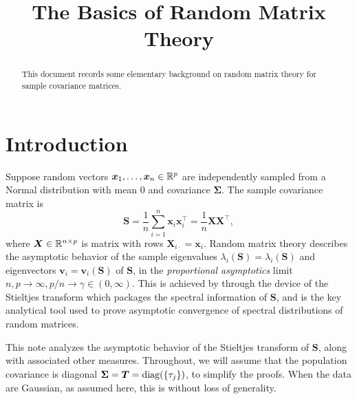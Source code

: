 \documentclass{article}
\title{ {\bf The Basics of Random Matrix Theory} }
\newcommand{\bx}{\boldsymbol{x}}
\newcommand{\bv}{\boldsymbol{v}}
\newcommand{\bX}{\boldsymbol{X}}
\newcommand{\bSigma}{\boldsymbol{\Sigma}}
\newcommand{\bS}{\boldsymbol{S}}
\newcommand{\bT}{\boldsymbol{T}}
\begin{document}
	
\maketitle
\RaggedRight

\begin{abstract}
	This document records some elementary background on random matrix theory for sample covariance matrices.
\end{abstract}

\section{Introduction}

Suppose random vectors $\bx_1,\ldots,\bx_n \in \Reals^p$ are independently sampled from a Normal distribution with mean $0$ and covariance $\bSigma$. The sample covariance matrix is
$$
\bS = \frac{1}{n}\sum_{i = 1}^{n} \bx_i \bx_i^{\top} = \frac{1}{n}\bX \bX^{\top},
$$ 
where $\bX \in \Reals^{n \times p}$ is matrix with rows $\bX_{i\cdot} = \bx_i$. Random matrix theory describes the asymptotic behavior of the sample eigenvalues $\lambda_i(\bS) = \lambda_i(\bS)$ and eigenvectors $\bv_i = \bv_i(\bS)$ of $\bS$, in the \emph{proportional asymptotics} limit $n,p \to \infty, p/n \to \gamma \in (0,\infty)$. This is achieved by through the device of the Stieltjes transform which packages the spectral information of $\bS$, and is the key analytical tool used to prove asymptotic convergence of spectral distributions of random matrices.

This note analyzes the asymptotic behavior of the Stieltjes transform of $\bS$, along with associated other measures. Throughout, we will assume that the population covariance is diagonal $\bSigma = \bT = \diag(\{\tau_j\})$, to simplify the proofs. When the data are Gaussian, as assumed here, this is without loss of generality.  
\end{document}
